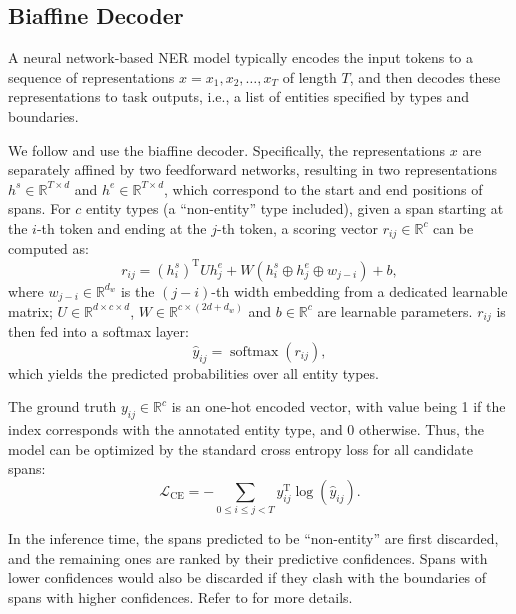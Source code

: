 \documentclass[11pt]{article}
\newcommand{\softmax}{\operatorname{softmax}}
\begin{document}
\subsection{Biaffine Decoder}
A neural network-based NER model typically encodes the input tokens to a sequence of representations $x = x_1, x_2, \dots, x_T$ of length $T$, and then decodes these representations to task outputs, i.e., a list of entities specified by types and boundaries. 

We follow \citet{yu-etal-2020-named} and use the biaffine decoder. Specifically, the representations $x$ are separately affined by two feedforward networks, resulting in two representations $h^s \in \mathbb{R}^{T \times d}$ and $h^e \in \mathbb{R}^{T \times d}$, which correspond to the start and end positions of spans. For $c$ entity types (a ``non-entity'' type included), given a span starting at the $i$-th token and ending at the $j$-th token, a scoring vector $r_{ij} \in \mathbb{R}^c$ can be computed as: 
\begin{equation}
    r_{ij} = (h^s_i)^{\mathrm T} U h^e_j + W (h^s_i \oplus h^e_j \oplus w_{j-i}) + b,
\end{equation}
where $w_{j-i} \in \mathbb{R}^{d_w}$ is the $(j-i)$-th width embedding from a dedicated learnable matrix; $U \in \mathbb{R}^{d \times c \times d}$, $W \in \mathbb{R}^{c \times (2d+d_w)}$ and $b \in \mathbb{R}^c$ are learnable parameters. $r_{ij}$ is then fed into a softmax layer: 
\begin{equation}
    \hat{y}_{ij} = \softmax (r_{ij}), 
\end{equation}
which yields the predicted probabilities over all entity types. 

The ground truth $y_{ij} \in \mathbb{R}^c$ is an one-hot encoded vector, with value being 1 if the index corresponds with the annotated entity type, and 0 otherwise. Thus, the model can be optimized by the standard cross entropy loss for all candidate spans: 
\begin{equation}
    \mathcal{L}_\mathrm{CE} = -\sum_{0 \leq i \leq j < T} y_{ij}^{\mathrm T} \log(\hat{y}_{ij}).
\end{equation}

In the inference time, the spans predicted to be ``non-entity'' are first discarded, and the remaining ones are ranked by their predictive confidences. Spans with lower confidences would also be discarded if they clash with the boundaries of spans with higher confidences. Refer to \citet{yu-etal-2020-named} for more details. 
\end{document}
